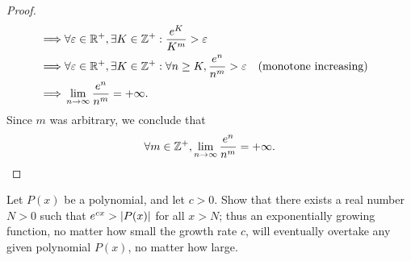 \begin{proof}
\begin{align*}
    \implies & \forall \varepsilon \in \mathbb{R}^+, \exists K \in \mathbb{Z}^+ : \dfrac{e^K}{K^m} > \varepsilon                                                                              \\
    \implies & \forall \varepsilon \in \mathbb{R}^+, \exists K \in \mathbb{Z}^+ : \forall n \geq K, \dfrac{e^n}{n^m} > \varepsilon                          &  & \text{(monotone increasing)} \\
    \implies & \lim_{n \to \infty} \dfrac{e^n}{n^m} = +\infty.
  \end{align*}
  Since \(m\) was arbitrary, we conclude that
  \[
    \forall m \in \mathbb{Z}^+, \lim_{n \to \infty} \dfrac{e^n}{n^m} = +\infty.
  \]
\end{proof}

\begin{ex}\label{ii:ex:4.5.9}
  Let \(P(x)\) be a polynomial, and let \(c > 0\).
  Show that there exists a real number \(N > 0\) such that \(e^{cx} > \left\lvert P(x)\right\rvert\) for all \(x > N\);
  thus an exponentially growing function, no matter how small the growth rate \(c\), will eventually overtake any given polynomial \(P(x)\), no matter how large.
\end{ex}

